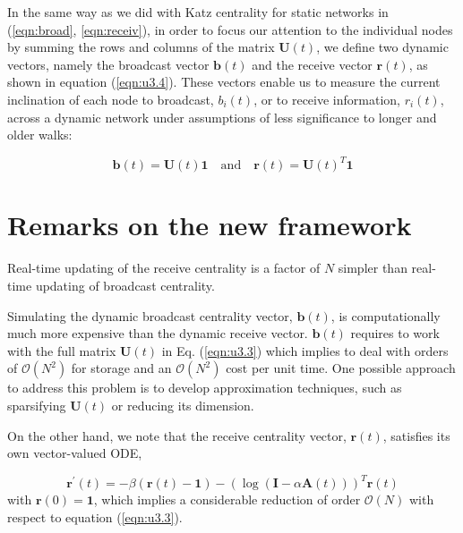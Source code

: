In the same way as we did with Katz centrality for static networks in (\ref{eqn:broad}, \ref{eqn:receiv}), in order to focus our attention to the individual nodes by summing the rows and columns of the matrix $\mathbf{U}(t)$, we define two dynamic vectors, namely the broadcast vector $\mathbf{b}(t)$ and the receive vector $\mathbf{r}(t)$, as shown in equation (\ref{eqn:u3.4}). These vectors enable us to measure the current inclination of each node to broadcast, $b_i(t)$, or to receive information, $r_i(t)$, across a dynamic network under assumptions of less significance to longer and older walks:

\begin{equation}
\label{eqn:u3.4}
    \mathbf{b}(t) = \mathbf{U}(t)\mathbf{1} \text{~~~and~~~} \mathbf{r}(t) = \mathbf{U}(t)^T\mathbf{1}
\end{equation}


\section{Remarks on the new framework}
\label{sec:remarks}

\begin{highlightedParagraphC}
 
Real-time updating of the receive centrality is a factor of $N$ simpler than real-time updating of broadcast centrality.

\end{highlightedParagraphC}

Simulating the dynamic broadcast centrality vector, $\mathbf{b}(t)$, is computationally much more expensive than the dynamic receive vector. $\mathbf{b}(t)$ requires to work with the full matrix $\mathbf{U}(t)$ in Eq. (\ref{eqn:u3.3}) which implies to deal with orders of $\mathcal{O}(N^2)$ for storage and an $\mathcal{O}(N^2)$ cost per unit time. One possible approach to address this problem is to develop approximation techniques, such as sparsifying $\mathbf{U}(t)$ or reducing its dimension.

On the other hand, we note that the receive centrality vector, $\mathbf{r}(t)$, satisfies its own vector-valued ODE, 

\begin{equation}
\label{eqn:u4.1}
    \mathbf{r^{\prime}}(t) = -\beta (\mathbf{r}(t) - \mathbf{1}) - (\log (\mathbf{I} - \alpha \mathbf{A}(t)))^T\mathbf{r}(t)
\end{equation} with $\mathbf{r}(0)=\mathbf{1}$, which implies a considerable reduction of order $\mathcal{O}(N)$ with respect to equation (\ref{eqn:u3.3}).

